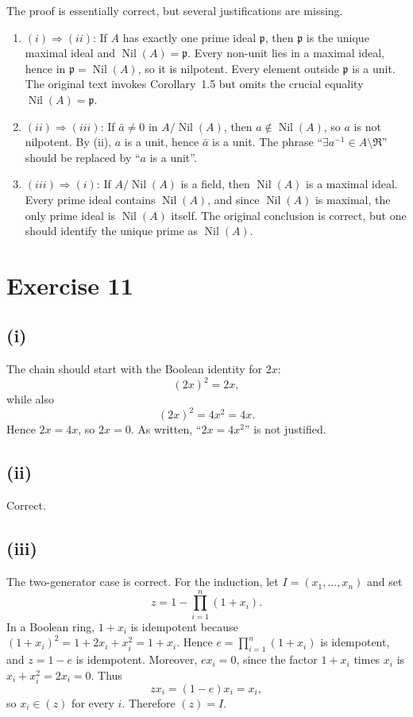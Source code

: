 \documentclass[11pt]{article}
\DeclareMathOperator{\Nil}{Nil}
\newcommand{\fp}{\mathfrak p}
\begin{document}
The proof is essentially correct, but several justifications are missing.

\begin{enumerate}[label=(\roman*)]
  \item \((i)\Rightarrow(ii)\): If \(A\) has exactly one prime ideal
        \(\fp\), then \(\fp\) is the unique maximal ideal and
        \(\Nil(A)=\fp\).  Every non-unit lies in a maximal ideal, hence in
        \(\fp=\Nil(A)\), so it is nilpotent.  Every element outside \(\fp\)
        is a unit.  The original text invokes Corollary~1.5 but omits the
        crucial equality \(\Nil(A)=\fp\).

  \item \((ii)\Rightarrow(iii)\): If \(\bar a\neq0\) in \(A/\Nil(A)\), then
        \(a\notin\Nil(A)\), so \(a\) is not nilpotent.  By (ii), \(a\) is a
        unit, hence \(\bar a\) is a unit.  The phrase
        ``\(\exists a^{-1}\in A\setminus\mathfrak R\)'' should be replaced by
        ``\(a\) is a unit''.

  \item \((iii)\Rightarrow(i)\): If \(A/\Nil(A)\) is a field, then
        \(\Nil(A)\) is a maximal ideal.  Every prime ideal contains
        \(\Nil(A)\), and since \(\Nil(A)\) is maximal, the only prime ideal is
        \(\Nil(A)\) itself.  The original conclusion is correct, but one
        should identify the unique prime as \(\Nil(A)\).
\end{enumerate}

\section*{Exercise 11}

\subsection*{(i)}
The chain should start with the Boolean identity for \(2x\):
\[
(2x)^2=2x,
\]
while also
\[
(2x)^2=4x^2=4x.
\]
Hence \(2x=4x\), so \(2x=0\).  As written, ``\(2x=4x^2\)'' is not justified.

\subsection*{(ii)}
Correct.

\subsection*{(iii)}
The two-generator case is correct.  For the induction, let
\(I=(x_1,\ldots,x_n)\) and set
\[
z=1-\prod_{i=1}^n(1+x_i).
\]
In a Boolean ring, \(1+x_i\) is idempotent because
\((1+x_i)^2=1+2x_i+x_i^2=1+x_i\).  Hence
\(e=\prod_{i=1}^n(1+x_i)\) is idempotent, and \(z=1-e\) is idempotent.
Moreover, \(ex_i=0\), since the factor \(1+x_i\) times \(x_i\) is
\(x_i+x_i^2=2x_i=0\).  Thus
\[
zx_i=(1-e)x_i=x_i,
\]
so \(x_i\in(z)\) for every \(i\).  Therefore \((z)=I\).
\end{document}
